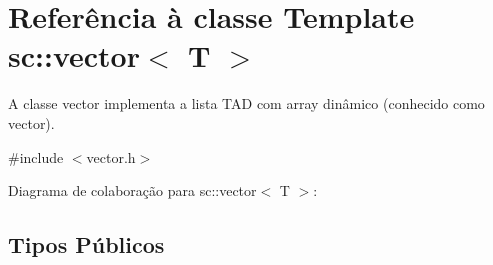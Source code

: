 \hypertarget{classsc_1_1vector}{}\section{Referência à classe Template sc\+:\+:vector$<$ T $>$}
\label{classsc_1_1vector}


A classe vector implementa a lista T\+AD com array dinâmico (conhecido como vector).  




{\ttfamily \#include $<$vector.\+h$>$}



Diagrama de colaboração para sc\+:\+:vector$<$ T $>$\+:
\subsection*{Tipos Públicos}
